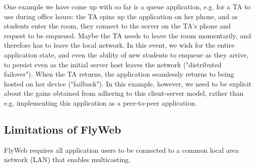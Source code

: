 One example we have come up with so far is a queue application, e.g. for a TA to use during office hours: the TA spins up the application on her phone, and as students enter the room, they connect to the server on the TA's phone and request to be enqueued. Maybe the TA needs to leave the room momentarily, and therefore has to leave the local network. In this event, we wish for the entire application state, and even the ability of new students to enqueue as they arrive, to persist even as the initial server host leaves the network ("distributed failover"). When the TA returns, the application seamlessly returns to being hosted on her device ("failback"). In this example, however, we need to be explicit about the gains obtained from adhering to this client-server model, rather than e.g. implementing this application as a peer-to-peer application.

\subsection{Limitations of FlyWeb}

FlyWeb requires all application users to be connected to a common local area network (LAN) that enables multicasting.

